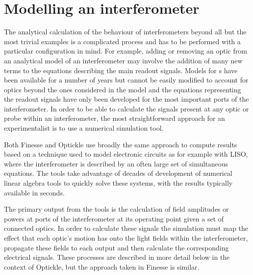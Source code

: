\section{\label{sec:ifo-modelling}Modelling an interferometer}
The analytical calculation of the behaviour of interferometers beyond all but the most trivial examples is a complicated process and has to be performed with a particular configuration in mind. For example, adding or removing an optic from an analytical model of an interferometer may involve the addition of many new terms to the equations describing the main readout signals. Models for \DRFPMI{}s have been available for a number of years \cite{Strain2003, Mueller2003, Mason2003} but cannot be easily modified to account for optics beyond the ones considered in the model and the equations representing the readout signals have only been developed for the most important ports of the interferometer. In order to be able to calculate the signals present at any optic or probe within an interferometer, the most straightforward approach for an experimentalist is to use a numerical simulation tool.

Both Finesse and Optickle use broadly the same approach to compute results based on a technique used to model electronic circuits as for example with \gls{LISO}, where the interferometer is described by an often large set of simultaneous equations. The tools take advantage of decades of development of numerical linear algebra tools to quickly solve these systems, with the results typically available in seconds.

The primary output from the tools is the calculation of field amplitudes or powers at ports of the interferometer at its operating point given a set of connected optics. In order to calculate these signals the simulation must map the effect that each optic's motion has onto the light fields within the interferometer, propagate these fields to each output and then calculate the corresponding electrical signals. These processes are described in more detail below in the context of Optickle, but the approach taken in Finesse is similar.

